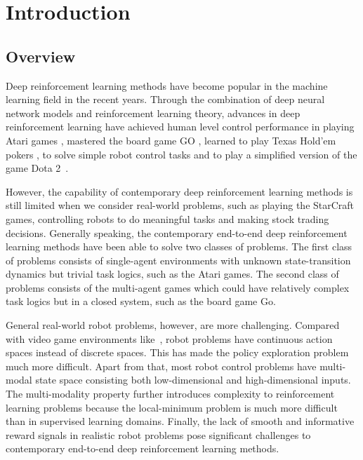
\chapter{Introduction}
\section{Overview}
Deep reinforcement learning methods have become popular in the machine learning field in the recent years. Through the combination of deep neural network models and reinforcement learning theory, advances in deep reinforcement learning have achieved human level control performance in playing Atari games \cite{mnih2015human}, mastered the board game GO \cite{silver2016mastering}, learned to play Texas Hold'em pokers \cite{heinrich2016deep}, to solve simple robot control tasks \cite{duan2016benchmarking} and to play a simplified version of the game Dota 2~\cite{openai_2018}.

However, the capability of contemporary deep reinforcement learning methods is still limited when we consider real-world problems, such as playing the StarCraft games, controlling robots to do meaningful tasks and making stock trading decisions. Generally speaking, the contemporary end-to-end deep reinforcement learning methods have been able to solve two classes of problems. The first class of problems consists of single-agent environments with unknown state-transition dynamics but trivial task logics, such as the Atari games. The second class of problems consists of the multi-agent games which could have relatively complex task logics but in a closed system, such as the board game Go. 

General real-world robot problems, however, are more challenging. Compared with video game environments like~\cite{mnih2015human}, robot problems have continuous action spaces instead of discrete spaces. This has made the policy exploration problem much more difficult. Apart from that, most robot control problems have multi-modal state space consisting both low-dimensional and high-dimensional inputs. The multi-modality property further introduces complexity to reinforcement learning problems because the local-minimum problem is much more difficult than in supervised learning domains. Finally, the lack of smooth and informative reward signals in realistic robot problems pose significant challenges to contemporary end-to-end deep reinforcement learning methods.

